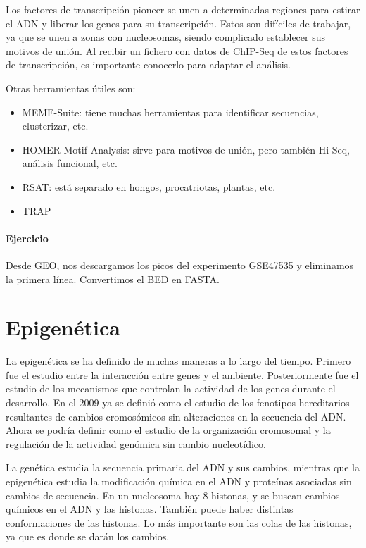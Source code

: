 Los factores de transcripción pioneer se unen a determinadas regiones para estirar el ADN y liberar los genes para su transcripción. Estos son difíciles de trabajar, ya que se unen a zonas con nucleosomas, siendo complicado establecer sus motivos de unión. Al recibir un fichero con datos de ChIP-Seq de estos factores de transcripción, es importante conocerlo para adaptar el análisis. 

Otras herramientas útiles son:
\begin{itemize}
\item MEME-Suite: tiene muchas herramientas para identificar secuencias, clusterizar, etc.
\item HOMER Motif Analysis: sirve para motivos de unión, pero también Hi-Seq, análisis funcional, etc.
\item RSAT: está separado en hongos, procatriotas, plantas, etc.
\item TRAP
\end{itemize}

\subsubsection{Ejercicio}
Desde GEO, nos descargamos los picos del experimento GSE47535 y eliminamos la primera línea. Convertimos el BED en FASTA.


\chapter{Epigenética}
La epigenética se ha definido de muchas maneras a lo largo del tiempo. Primero fue el estudio entre la interacción entre genes y el ambiente. Posteriormente fue el estudio de los mecanismos que controlan la actividad de los genes durante el desarrollo. En el 2009 ya se definió como el estudio de los fenotipos hereditarios resultantes de cambios cromosómicos sin alteraciones en la secuencia del ADN. Ahora se podría definir como el estudio de la organización cromosomal y la regulación de la actividad genómica sin cambio nucleotídico. 

La genética estudia la secuencia primaria del ADN y sus cambios, mientras que la epigenética estudia la modificación química en el ADN y proteínas asociadas sin cambios de secuencia. En un nucleosoma hay 8 histonas, y se buscan cambios químicos en el ADN y las histonas. También puede haber distintas conformaciones de las histonas. Lo más importante son las colas de las histonas, ya que es donde se darán los cambios. 

